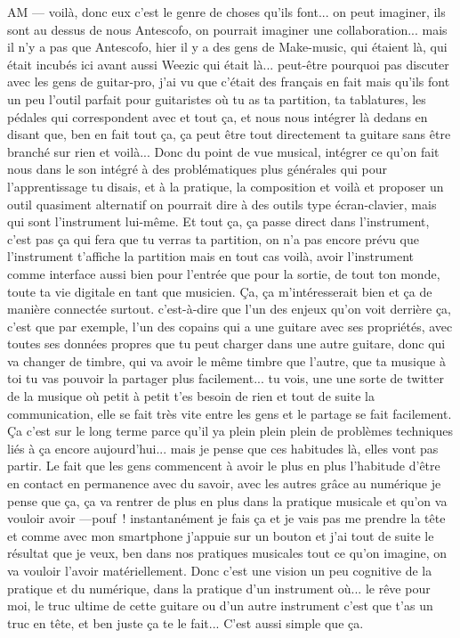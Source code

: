 AM — voilà, donc eux c'est le genre de choses qu'ils font... on peut imaginer, ils sont au dessus de nous Antescofo, on pourrait imaginer une collaboration... mais il n'y a pas que Antescofo, hier il y a des gens de Make-music, qui étaient là, qui était incubés ici avant aussi Weezic qui était là... peut-être pourquoi pas discuter avec les gens de guitar-pro, j'ai vu que c'était des français en fait mais qu'ils font un peu l'outil parfait pour guitaristes où tu as ta partition, ta tablatures, les pédales qui correspondent avec et tout ça, et nous nous intégrer là dedans en disant que, ben en fait tout ça, ça peut être tout directement ta guitare sans être branché sur rien et voilà... Donc du point de vue musical, intégrer ce qu'on fait nous dans le son intégré à des problématiques plus générales qui pour l'apprentissage tu disais, et à la pratique, la composition et voilà et proposer un outil quasiment alternatif on pourrait dire à des outils type écran-clavier, mais qui sont l'instrument lui-même. Et tout ça, ça passe direct dans l'instrument, c'est pas ça qui fera que tu verras ta partition, on n'a pas encore prévu que l'instrument t'affiche la partition mais en tout cas voilà, avoir l'instrument comme interface aussi bien pour l'entrée que pour la sortie, de tout ton monde, toute ta vie digitale en tant que musicien. Ça, ça m'intéresserait bien et ça de manière connectée surtout. 
c'est-à-dire que l'un des enjeux qu'on voit derrière ça, c'est que par exemple, l'un des copains qui a une guitare avec ses propriétés, avec toutes ses données propres que tu peut charger dans une autre guitare, donc qui va changer de timbre, qui va avoir le même timbre que l'autre, que ta musique à toi tu vas pouvoir la partager plus facilement... tu vois, une une sorte de twitter de la musique où petit à petit t'es besoin de rien et tout de suite la communication, elle se fait très vite entre les gens et le partage se fait facilement. Ça c'est sur le long terme parce qu'il ya plein plein plein de problèmes techniques liés à ça encore aujourd'hui... mais je pense que ces habitudes là, elles vont pas partir. Le fait que les gens commencent à avoir le plus en plus l'habitude d'être en contact en permanence avec du savoir, avec les autres grâce au numérique je pense que ça, ça va rentrer de plus en plus dans la pratique musicale et qu'on va vouloir avoir —pouf ! instantanément je fais ça et je vais pas me prendre la tête et comme avec mon smartphone j'appuie sur un bouton et j'ai tout de suite le résultat que je veux, ben dans nos pratiques musicales tout ce qu'on imagine, on va vouloir l'avoir matériellement. Donc c'est une vision un peu cognitive de la pratique et du numérique, dans la pratique d'un instrument où... le rêve pour moi, le truc ultime de cette guitare ou d'un autre instrument c'est que t'as un truc en tête, et ben juste ça te le fait... C'est aussi simple que ça. 
